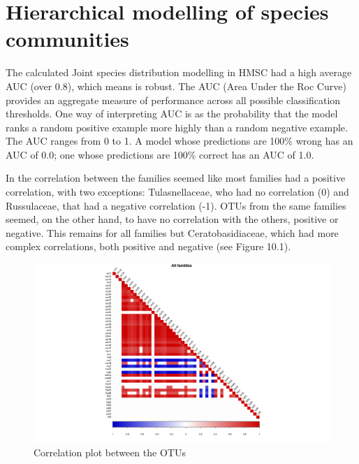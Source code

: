 \chapter{Hierarchical modelling of species communities}
\label{hierarchicalmodellingofspeciescommunities}

The calculated Joint species distribution modelling in HMSC had a high average AUC (over 0.8), which means is robust. The AUC (Area Under the Roc Curve) provides an aggregate measure of performance across all possible classification thresholds. One way of interpreting AUC is as the probability that the model ranks a random positive example more highly than a random negative example. The AUC ranges from 0 to 1. A model whose predictions are 100\% wrong has an AUC of 0.0; one whose predictions are 100\% correct has an AUC of 1.0.

In the correlation between the families seemed like most families had a positive correlation, with two exceptions: Tulasnellaceae, who had no correlation (0) and Russulaceae, that had a negative correlation (-1). OTUs from the same families seemed, on the other hand, to have no correlation with the others, positive or negative. This remains for all families but Ceratobasidiaceae, which had more complex correlations, both positive and negative (see Figure 10.1).

\begin{figure}[htbp]
\centering
\includegraphics[keepaspectratio,width=\textwidth,height=0.75\textheight]{images/corrPlot.png}
\caption{Correlation plot between the OTUs}
\end{figure}


